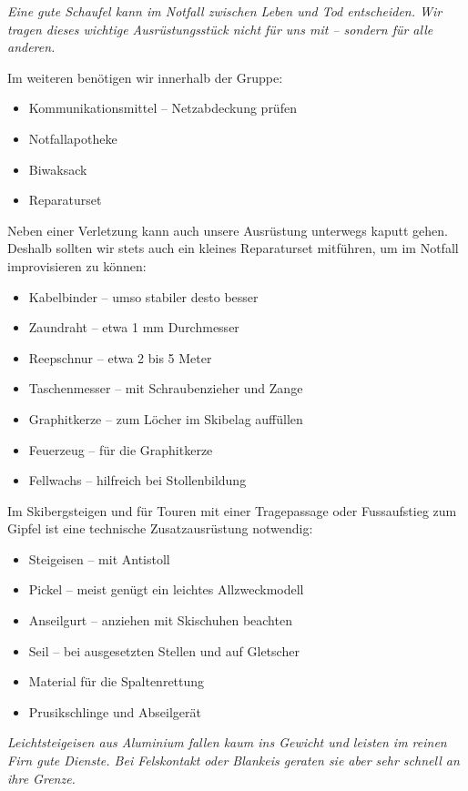 \textit{Eine gute Schaufel kann im Notfall zwischen Leben und Tod entscheiden. Wir tragen dieses wichtige Ausrüstungsstück nicht für uns mit -- sondern für alle anderen.}

Im weiteren benötigen wir innerhalb der Gruppe:

\begin{itemize}
  \item{Kommunikationsmittel -- Netzabdeckung prüfen}
  \item{Notfallapotheke}
  \item{Biwaksack}
  \item{Reparaturset}
\end{itemize}

Neben einer Verletzung kann auch unsere Ausrüstung unterwegs kaputt gehen.
Deshalb sollten wir stets auch ein kleines Reparaturset mitführen, um im Notfall improvisieren zu können:

\begin{itemize}
  \item{Kabelbinder -- umso stabiler desto besser}
  \item{Zaundraht -- etwa 1 mm Durchmesser}
  \item{Reepschnur -- etwa 2 bis 5 Meter}
  \item{Taschenmesser -- mit Schraubenzieher und Zange}
  \item{Graphitkerze -- zum Löcher im Skibelag auffüllen}
  \item{Feuerzeug -- für die Graphitkerze}
  \item{Fellwachs -- hilfreich bei Stollenbildung}
\end{itemize}

\newcolumn

Im Skibergsteigen und für Touren mit einer Tragepassage oder Fussaufstieg zum Gipfel ist eine technische Zusatzausrüstung notwendig:

\begin{itemize}
  \item{Steigeisen -- mit Antistoll}
  \item{Pickel -- meist genügt ein leichtes Allzweckmodell}
  \item{Anseilgurt -- anziehen mit Skischuhen beachten}
  \item{Seil -- bei ausgesetzten Stellen und auf Gletscher}
  \item{Material für die Spaltenrettung}
  \item{Prusikschlinge und Abseilgerät}
\end{itemize}

\textit{Leichtsteigeisen aus Aluminium fallen kaum ins Gewicht und leisten im reinen Firn gute Dienste. Bei Felskontakt oder Blankeis geraten sie aber sehr schnell an ihre Grenze.}